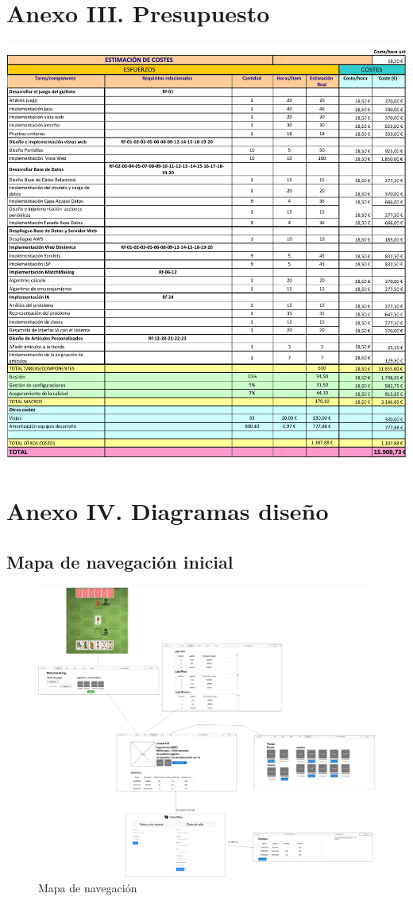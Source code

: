 \documentclass[]{article}
\begin{document}
\section*{Anexo III. Presupuesto}
\label{an3}
\hspace{-1.3cm}
\includegraphics[scale=0.9]{figuras/presup.pdf}
\clearpage
\section*{Anexo IV. Diagramas diseño}
\label{an4}
\subsection*{Mapa de navegación inicial}
\begin{figure}[H]
  \includegraphics[width=\linewidth]{figuras/mapaNavegacion.png}
  \caption{Mapa de navegación}
  \label{fig:mapaDeNavegacion}
\end{figure}
\end{document}
